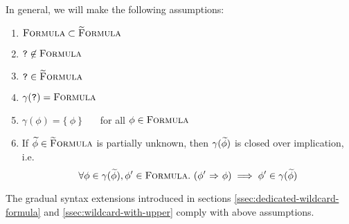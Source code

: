 In general, we will make the following assumptions:
\begin{enumerate}
    \item $\textup{\textsc{Formula}} \subset \textup{\textsc{\ensuremath{\widetilde{\text{F}}}ormula}}$
    \item $\textup{\texttt{?}} \not \in \textup{\textsc{Formula}}$
    \item $\textup{\texttt{?}} \in \textup{\textsc{\ensuremath{\widetilde{\text{F}}}ormula}}$
    \item $\gamma(\textup{\texttt{?}}) = \textup{\textsc{Formula}}$
    \item $\gamma(\phi) = \{~\phi~\}$ ~~~for all $\phi \in \textup{\textsc{Formula}}$
    \item If $\widetilde{\phi} \in \textup{\textsc{\ensuremath{\widetilde{\text{F}}}ormula}}$ is partially unknown, then $\gamma(\widetilde{\phi})$ is closed over implication, i.e.
    \begin{displaymath}
    \forall \phi \in \gamma(\widetilde{\phi}), \phi' \in \textup{\textsc{Formula}}.~ ({\phi'} \,\,{\Rightarrow}\,\, {\phi}) \implies \phi' \in \gamma(\widetilde{\phi})
    \end{displaymath}
\end{enumerate}

The gradual syntax extensions introduced in sections \ref{ssec:dedicated-wildcard-formula} and \ref{ssec:wildcard-with-upper} comply with above assumptions.